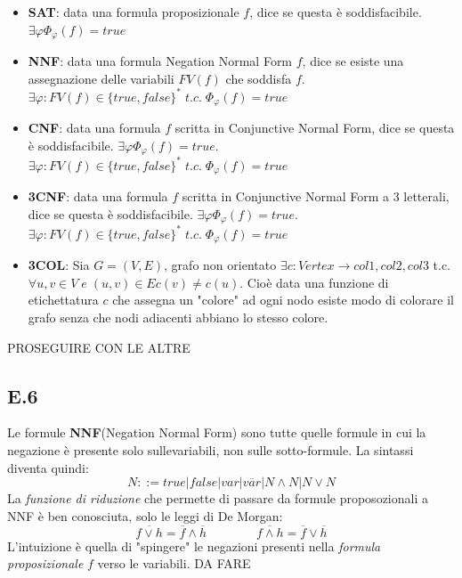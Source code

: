 \documentclass[a4paper]{article}
\begin{document}
\begin{itemize}
	\item \textbf{SAT}: data una formula proposizionale $f$, dice se questa è soddisfacibile. $\exists \varphi \Phi _ {\varphi}(f) = true $
	\item \textbf{NNF}: data una formula Negation Normal Form $f$, dice se esiste una assegnazione delle variabili $FV(f)$ che soddisfa $f$.\\$\exists \varphi:FV(f) \in \{true,false\}^* \; t.c. \; \Phi _ {\varphi}(f) = true $
	\item \textbf{CNF}: data una formula $f$ scritta in Conjunctive Normal Form, dice se questa è soddisfacibile. $\exists \varphi \Phi _ {\varphi}(f) = true $.\\
$\exists \varphi:FV(f) \in \{true,false\}^* \; t.c. \; \Phi _ {\varphi}(f) = true $
	\item \textbf{3CNF}: data una formula $f$ scritta in Conjunctive Normal Form a 3 letterali, dice se questa è soddisfacibile. $\exists \varphi \Phi _ {\varphi}(f) = true $.\\
$\exists \varphi:FV(f) \in \{true,false\}^* \; t.c. \; \Phi _ {\varphi}(f) = true $
	\item \textbf{3COL}: Sia $G = (V,E)$, grafo non orientato $\exists c : Vertex \rightarrow {col1,col2,col3}$ t.c. $\forall u,v \in V \; e \; (u,v) \in E c(v) \neq c(u)$.
		Cioè data una funzione di etichettatura $c$ che assegna un "colore" ad ogni nodo esiste modo di colorare il grafo senza che nodi adiacenti abbiano lo stesso colore.

\end{itemize}
PROSEGUIRE CON LE ALTRE
\subsection{E.6}
Le formule \textbf{NNF}(Negation Normal Form) sono tutte quelle formule in cui la negazione è presente solo sullevariabili, non sulle sotto-formule.
La sintassi diventa quindi:
$$ N ::= true|false|var|\overline{var}|N \land N|N \lor N$$
La \textit{funzione di riduzione} che permette di passare da formule proposozionali a NNF è ben conosciuta, solo le leggi di De Morgan:
$$ \overline{f \lor h} = \overline{f} \land \overline{h} \qquad \qquad \overline{f \land h} = \overline{f} \lor \overline{h}$$
L'intuizione è quella di "spingere" le negazioni presenti nella \textit{formula proposizionale} $f$ verso le variabili.
DA FARE
\end{document}
